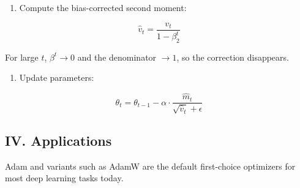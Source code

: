 \begin{enumerate}
\def\labelenumi{\arabic{enumi}.}
\setcounter{enumi}{5}
\tightlist
\item
{}
  Compute the bias-corrected second moment:
\end{enumerate}

\[
\hat{v}_t = \frac{v_t}{1-\beta_2^t}
\]

For large \(t\), \(\beta^t \to 0\) and the denominator \(\to 1\), so the correction disappears.

\begin{enumerate}
\def\labelenumi{\arabic{enumi}.}
\setcounter{enumi}{6}
\tightlist
\item
{}
  Update parameters:
\end{enumerate}

\[
\theta_t = \theta_{t-1} - \alpha \cdot \frac{\hat{m}_t}{\sqrt{\hat{v}_t}+\epsilon}
\]

\hypertarget{iv.-applications}{%
\subsection{IV. Applications}\label{iv.-applications}}

Adam and variants such as AdamW are the default first-choice optimizers for most deep learning tasks today.

